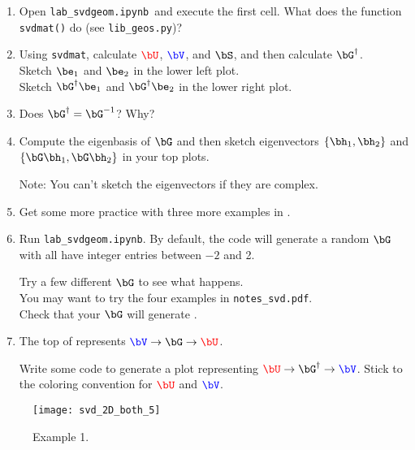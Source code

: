 \documentclass[11pt,titlepage,fleqn]{article}
\newcommand{\tfile}{{\tt lab\_svdgeom.ipynb}}
\begin{document}
\begin{enumerate}
\item Open \tfile\ and execute the first cell. What does the function \verb+svdmat()+ do (see \verb+lib_geos.py+)?

\item Using \verb+svdmat+, calculate $\Ucolor$, $\Vcolor$, and $\bS$, and then calculate $\bG^{\dagger}$. \\
Sketch $\be_1$ and $\be_2$ in the lower left plot. \\
Sketch $\bG^{\dagger}\be_1$ and $\bG^{\dagger}\be_2$ in the lower right plot.

\item Does $\bG^{\dagger} = \bG^{-1}$? Why?

\item Compute the eigenbasis of $\bG$ and then sketch eigenvectors $\{\bh_1,\bh_2\}$ and $\{\bG\bh_1,\bG\bh_2\}$ in your top plots.

Note: You can't sketch the eigenvectors if they are complex.

\item Get some more practice with three more examples in .

\item Run \tfile. By default, the code will generate a random $\bG$ with all have integer entries between $-2$ and 2.

Try a few different $\bG$ to see what happens. \\
You may want to try the four examples in \verb+notes_svd.pdf+. \\
Check that your $\bG$ will generate .

\item The top of  represents $\Vcolor \rightarrow \bG \rightarrow \Ucolor$.

Write some code to generate a plot representing $\Ucolor \rightarrow \bG^{\dagger} \rightarrow \Vcolor$. Stick to the coloring convention for $\Ucolor$ and $\Vcolor$.

\end{enumerate}



\clearpage\pagebreak
\begin{figure}
\hspace{-1cm}
\texttt{[image: svd\_2D\_both\_5]}
\caption[]
{{
Example 1.
\label{fig:ex1}
}}
\end{figure}
\end{document}
